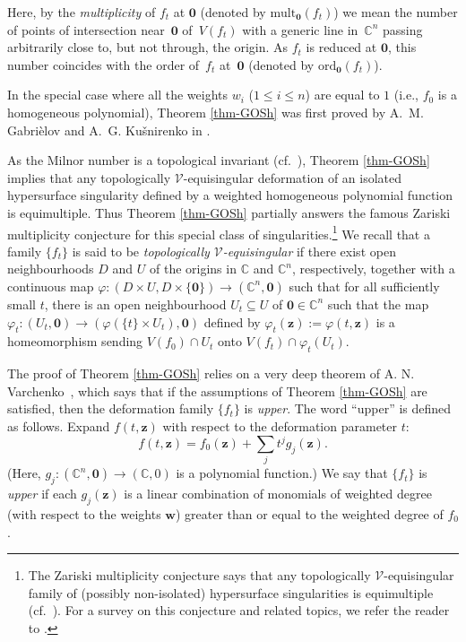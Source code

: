 \documentclass[a4paper,fleqn,11pt]{amsart}
\theoremstyle{definition}
\theoremstyle{remark}
\numberwithin{equation}{section}
\begin{document}
Here, by the \emph{multiplicity} of $f_t$ at $\mathbf{0}$ (denoted by $\mbox{mult}_{\mathbf{0}}(f_t)$) we mean the number of points of intersection near~$\mathbf{0}$ of~$V(f_t)$ with a generic line in~$\mathbb{C}^n$ passing arbitrarily close to, but not through, the origin. As $f_t$ is reduced at $\mathbf{0}$, this number  coincides with the order of~$f_t$ at~$\mathbf{0}$ (denoted by $\mbox{ord}_{\mathbf{0}}(f_t)$).

In the special case where all the weights $w_i$ ($1\leq i\leq n$) are equal to $1$ (i.e., $f_0$ is a homogeneous polynomial), Theorem \ref{thm-GOSh} was first proved by A.~M. Gabri\`elov and A.~G. Ku\v{s}nirenko in \cite{GK}.

As the Milnor number is a topological invariant (cf.~\cite{L3,Mi,T1,T2,T3}), Theorem \ref{thm-GOSh} implies that any topologically $\mathscr{V}$-equisingular deformation of an isolated hypersurface singularity defined by a weighted homogeneous polynomial function is equimultiple. Thus Theorem \ref{thm-GOSh} partially answers the famous Zariski multiplicity conjecture \cite{Z} for this special class of singularities.\footnote{The Zariski multiplicity conjecture says that any topologically $\mathscr{V}$-equisingular family of (possibly non-isolated) hypersurface singularities is equimultiple (cf.~\cite{Z}). For a survey on this conjecture and related topics, we refer the reader to \cite{E2,EyBook}.}
We recall that a family $\{f_t\}$ is said to be \emph{topologically $\mathscr{V}$-equisingular} if there exist open neighbourhoods $D$ and $U$ of the origins in $\mathbb{C}$ and $\mathbb{C}^n$, respectively, together with a continuous map $\varphi\colon (D\times U, D\times \{\mathbf{0}\})\rightarrow (\mathbb{C}^n,\mathbf{0})$ such that for all sufficiently small $t$, there is an open neighbourhood $U_t\subseteq U$ of $\mathbf{0}\in\mathbb{C}^n$ such that
the map $\varphi_t\colon (U_t,\mathbf{0})\rightarrow (\varphi(\{t\}\times U_t),\mathbf{0})$ defined by $\varphi_t(\mathbf{z}):=\varphi(t,\mathbf{z})$ is a homeomorphism sending $V(f_0)\cap U_t$ onto $V(f_t)\cap \varphi_t(U_t)$.

The proof of Theorem \ref{thm-GOSh} relies on a very deep theorem of A. N. Varchenko~\cite{V}, which says that if the assumptions of Theorem \ref{thm-GOSh} are satisfied, then the deformation family $\{f_t\}$ is \emph{upper}. The word ``upper'' is defined as follows. Expand $f(t,\mathbf{z})$ with respect to the deformation parameter $t$:
\begin{equation*}
f(t,\mathbf{z})=f_0(\mathbf{z})+\sum_{j} t^j g_j(\mathbf{z}).
\end{equation*}
(Here, $g_j\colon (\mathbb{C}^n,\mathbf{0})\to (\mathbb{C},0)$ is a polynomial function.) We say that $\{f_t\}$ is \emph{upper} if each $g_j(\mathbf{z})$ is a linear combination of monomials of weighted degree (with respect to the weights $\mathbf{w}$) greater than or equal to the weighted degree of $f_0$. 
\end{document}
